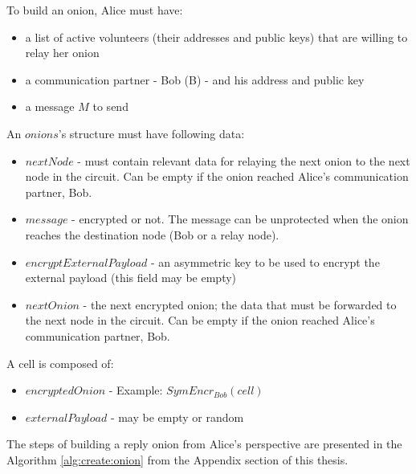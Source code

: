 To build an onion, Alice must have:

\begin{itemize}[leftmargin=1.5cm,labelindent=0cm]
    \item a list of active volunteers (their addresses and public keys) that are willing to relay her onion 
    \item a communication partner - Bob (B) - and his address and public key
    \item a message $M$ to send
\end{itemize}



An $ onions $'s structure must have following data:
\begin{itemize}[leftmargin=1.5cm,labelindent=0cm]
    \item $ nextNode $ - must contain relevant data for relaying the next onion to the next node in the circuit. Can be empty if the onion reached Alice's communication partner, Bob.
    \item $ message $ - encrypted or not. The message can be unprotected when the onion reaches the destination node (Bob or a relay node).  
    \item $ encryptExternalPayload $ - an asymmetric key to be used to encrypt the external payload (this field may be empty)
    \item $ nextOnion $ - the next encrypted onion; the data that must be forwarded to the next node in the circuit. Can be empty if the onion reached Alice's communication partner, Bob.
\end{itemize}

\vspace{5mm} %

A cell is composed of:
\begin{itemize}[leftmargin=1.5cm,labelindent=0cm]
    \item $encryptedOnion$ - Example: $SymEncr_{Bob}(cell)$
    \item $externalPayload$ - may be empty or random
\end{itemize}

\vspace{5mm} %

The steps of building a reply onion from Alice's perspective are presented in the Algorithm \ref{alg:create:onion} from the Appendix section of this thesis.


